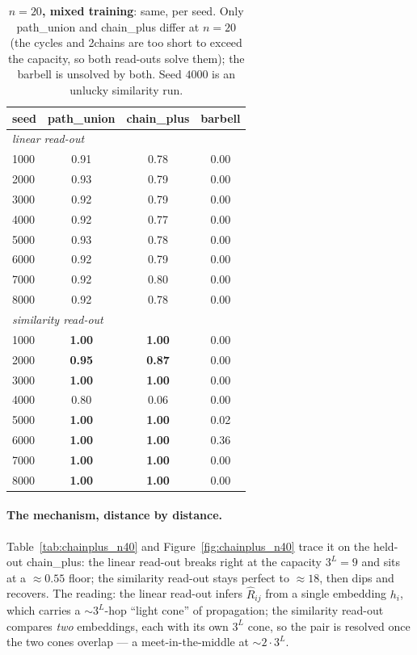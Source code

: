 \documentclass[11pt,a4paper]{article}
\begin{document}
\begin{table}[H]\centering\small
\begin{tabular}{lccc}
\toprule
seed & path\_union & chain\_plus & barbell \\
\midrule
\multicolumn{4}{l}{\emph{linear read-out}}\\
1000 & 0.91 & 0.78 & 0.00 \\
2000 & 0.93 & 0.79 & 0.00 \\
3000 & 0.92 & 0.79 & 0.00 \\
4000 & 0.92 & 0.77 & 0.00 \\
5000 & 0.93 & 0.78 & 0.00 \\
6000 & 0.92 & 0.79 & 0.00 \\
7000 & 0.92 & 0.80 & 0.00 \\
8000 & 0.92 & 0.78 & 0.00 \\
\midrule
\multicolumn{4}{l}{\emph{similarity read-out}}\\
1000 & \textbf{1.00} & \textbf{1.00} & 0.00 \\
2000 & \textbf{0.95} & \textbf{0.87} & 0.00 \\
3000 & \textbf{1.00} & \textbf{1.00} & 0.00 \\
4000 & 0.80 & 0.06 & 0.00 \\
5000 & \textbf{1.00} & \textbf{1.00} & 0.02 \\
6000 & \textbf{1.00} & \textbf{1.00} & 0.36 \\
7000 & \textbf{1.00} & \textbf{1.00} & 0.00 \\
8000 & \textbf{1.00} & \textbf{1.00} & 0.00 \\
\bottomrule\end{tabular}
\caption{\textbf{$n=20$, mixed training}: same, per seed. Only path\_union and chain\_plus differ
at $n=20$ (the cycles and 2chains are too short to exceed the capacity, so both read-outs solve
them); the barbell is unsolved by both. Seed $4000$ is an unlucky similarity run.}
\label{tab:simlin_n20}
\end{table}

\paragraph{The mechanism, distance by distance.} Table~\ref{tab:chainplus_n40} and
Figure~\ref{fig:chainplus_n40} trace it on the held-out chain\_plus: the linear read-out breaks
right at the capacity $3^L=9$ and sits at a $\approx0.55$ floor; the similarity read-out stays
perfect to $\approx18$, then dips and recovers. The reading: the linear read-out infers
$\hat R_{ij}$ from a single embedding $h_i$, which carries a $\sim3^L$-hop ``light cone'' of
propagation; the similarity read-out compares \emph{two} embeddings, each with its own $3^L$
cone, so the pair is resolved once the two cones overlap --- a meet-in-the-middle at
$\sim2\cdot 3^L$.
\end{document}
